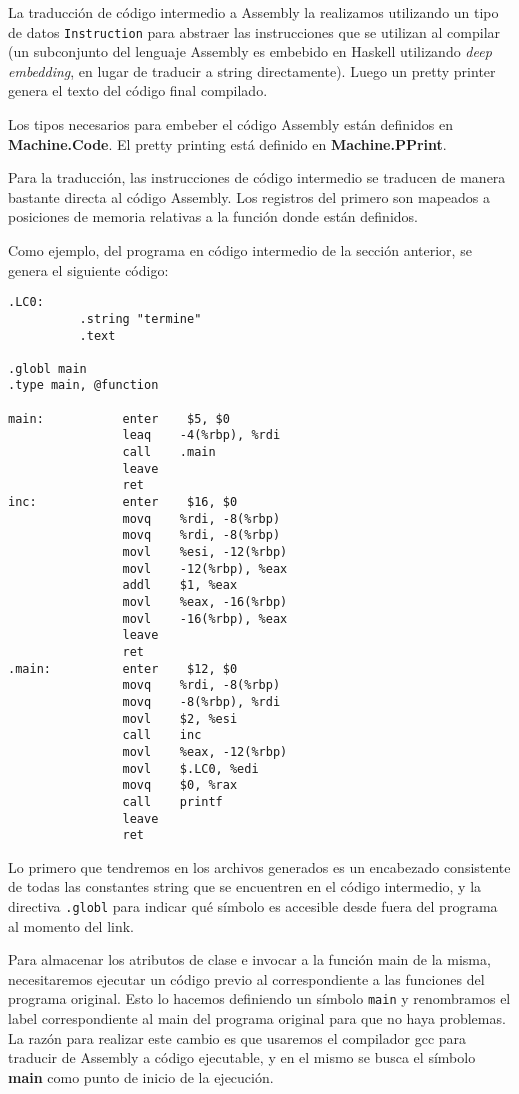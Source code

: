 \documentclass[a4paper,10pt]{article}
\begin{document}
La traducción de código intermedio a Assembly la realizamos utilizando un tipo de datos \verb|Instruction| para abstraer las instrucciones que 
se utilizan al compilar (un subconjunto del lenguaje Assembly es embebido en Haskell utilizando \textit{deep embedding}, en lugar de
traducir a string directamente). 
Luego un pretty printer genera el texto del código final compilado.

Los tipos necesarios para embeber el código Assembly están definidos en \textbf{Machine.Code}. El pretty printing está definido en \textbf{Machine.PPrint}.

Para la traducción, las instrucciones de código intermedio se traducen de manera bastante directa al código Assembly. Los registros del primero son mapeados
a posiciones de memoria relativas a la función donde están definidos. 

Como ejemplo, del programa en código intermedio de la sección anterior, se genera el siguiente código:

\begin{verbatim} 
.LC0:           
          .string "termine"
          .text

.globl main
.type main, @function

main:           enter    $5, $0
                leaq    -4(%rbp), %rdi
                call    .main
                leave
                ret
inc:            enter    $16, $0
                movq    %rdi, -8(%rbp)
                movq    %rdi, -8(%rbp)
                movl    %esi, -12(%rbp)
                movl    -12(%rbp), %eax
                addl    $1, %eax
                movl    %eax, -16(%rbp)
                movl    -16(%rbp), %eax
                leave
                ret
.main:          enter    $12, $0
                movq    %rdi, -8(%rbp)
                movq    -8(%rbp), %rdi
                movl    $2, %esi
                call    inc
                movl    %eax, -12(%rbp)
                movl    $.LC0, %edi
                movq    $0, %rax
                call    printf
                leave
                ret

\end{verbatim}

Lo primero que tendremos en los archivos generados es un encabezado consistente de todas las constantes string que se encuentren
en el código intermedio, y la directiva \verb|.globl| para indicar qué símbolo es accesible desde fuera del programa al momento del link.

Para almacenar los atributos de clase e invocar a la función main de la misma, necesitaremos ejecutar un código previo al correspondiente
a las funciones del programa original. Esto lo hacemos definiendo un símbolo \verb|main| y renombramos el label correspondiente al main del
programa original para que no haya problemas. La razón para realizar este cambio es que usaremos el compilador gcc para traducir de Assembly a código
ejecutable, y en el mismo se busca el símbolo \textbf{main} como punto de inicio de la ejecución.
\end{document}
